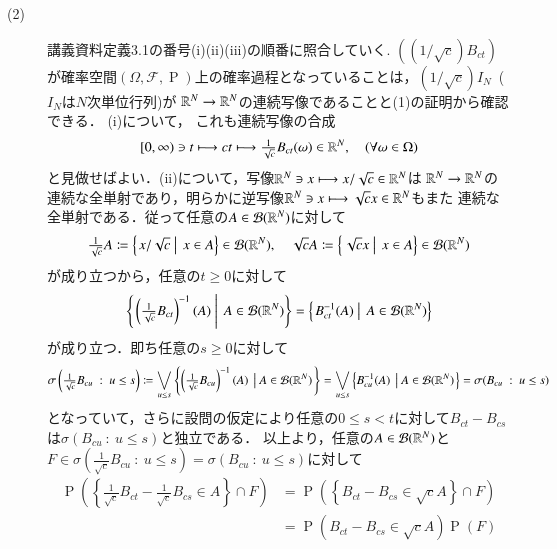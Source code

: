 \begin{prf}
\begin{description}
	\item[(2)] 講義資料定義3.1の番号(i)(ii)(iii)の順番に照合していく. $((1/\sqrt{c})B_{ct})$
		が確率空間$(\Omega, \mathcal{F}, \operatorname{P})$上の確率過程となっていることは，$(1/\sqrt{c})I_N$\ ($I_N$は$N$次単位行列)が
		$\mathbb{R}^N \rightarrow \mathbb{R}^N$の連続写像であることと(1)の証明から確認できる．
		(i)について，
		これも連続写像の合成
		\begin{align}
			[0,\infty) \ni t \longmapsto ct \longmapsto \tfrac{1}{\sqrt{c}} B_{ct}(\omega) \in \mathbb{R}^N, \quad(\forall \omega \in \Omega)
		\end{align}
		と見做せばよい．(ii)について，写像$\mathbb{R}^N \ni x \longmapsto x/\sqrt{c} \in \mathbb{R}^N$は
		$\mathbb{R}^N \rightarrow \mathbb{R}^N$の連続な全単射であり，明らかに逆写像$\mathbb{R}^N \ni x \longmapsto \sqrt{c}x \in \mathbb{R}^N$もまた
		連続な全単射である．従って任意の$A \in \mathcal{B}(\mathbb{R}^N)$に対して
		\begin{align}
			\tfrac{1}{\sqrt{c}} A \coloneqq \left\{\left. x/\sqrt{c}\ \right|\ x \in A \right\} \in \borel{\R^N}, \quad
			\sqrt{c} A \coloneqq \left\{\left. \sqrt{c}x\ \right|\ x \in A \right\} \in \borel{\R^N}
		\end{align}
		が成り立つから，任意の$t \geq 0$に対して
		\begin{align}
			\left\{\left. \left(\tfrac{1}{\sqrt{c}}B_{ct}\right)^{-1}(A)\ \right|\ A \in \mathcal{B}(\mathbb{R}^N) \right\}
			= \left\{\left. B_{ct}^{-1}(A)\ \right|\ A \in \mathcal{B}(\mathbb{R}^N) \right\}
		\end{align}
		が成り立つ．即ち任意の$s \geq 0$に対して
		\begin{align}
			\sigma\left(\tfrac{1}{\sqrt{c}}B_{cu}\ :\ u \leq s\right)
			\coloneqq \bigvee_{u \leq s} \left\{ \left(\tfrac{1}{\sqrt{c}}B_{cu}\right)^{-1}(A)\ \left|\ A \in \mathcal{B}(\mathbb{R}^N) \right.\right\}
			= \bigvee_{u \leq s} \left\{ B_{cu}^{-1}(A)\ \left|\ A \in \mathcal{B}(\mathbb{R}^N) \right.\right\}
			= \sigma(B_{cu}\ :\ u \leq s)
		\end{align}
		となっていて，さらに設問の仮定により任意の$0 \leq s < t$に対して$B_{ct} - B_{cs}$は$\sigma(B_{cu}\ :\ u \leq s)$と独立である．
		以上より，任意の$A \in \mathcal{B}(\mathbb{R}^N)$と$F \in \sigma\left(\tfrac{1}{\sqrt{c}}B_{cu}\ :\ u \leq s\right) = \sigma(B_{cu}\ :\ u \leq s)$に対して
		\begin{align}
			\operatorname{P}\left( \left\{ \tfrac{1}{\sqrt{c}}B_{ct} - \tfrac{1}{\sqrt{c}}B_{cs} \in A \right\} \cap F \right)
			&= \operatorname{P}\left( \left\{ B_{ct} - B_{cs} \in \sqrt{c}A \right\} \cap F \right) \\
			&= \operatorname{P}\left(B_{ct} - B_{cs} \in \sqrt{c}A \right)  \operatorname{P}(F) \\

\end{align}
\end{description}
\end{prf}

